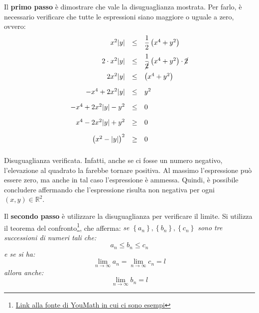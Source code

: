 \documentclass[a4paper]{article}
\begin{document}
	\noindent
	Il \textbf{primo passo} è dimostrare che vale la disuguaglianza mostrata. Per farlo, è necessario verificare che tutte le espressioni siano maggiore o uguale a zero, ovvero:
	\begin{equation*}
		\begin{array}{rcl}
			x^{2}|y| &\le& \dfrac{1}{2}\left(x^{4} + y^{2}\right) \\ [1em]
			2 \cdot x^{2}|y| &\le& \dfrac{1}{\cancel{2}}\left(x^{4} + y^{2}\right) \cdot \cancel{2} \\ [1em]
			2 x^{2}|y| &\le& \left(x^{4} + y^{2}\right) \\ [1em]
			-x^{4} + 2 x^{2}|y| &\le& y^{2} \\ [1em]
			-x^{4} + 2 x^{2}|y| - y^{2} &\le& 0 \\ [1em]
			x^{4} - 2 x^{2}|y| + y^{2} &\ge& 0 \\ [1em]
			\left(x^{2} - |y|\right)^{2} &\ge& 0 \\ [1em]
		\end{array}
	\end{equation*}
	Disuguaglianza verificata. Infatti, anche se ci fosse un numero negativo, l'elevazione al quadrato la farebbe tornare positiva. Al massimo l'espressione può essere zero, ma anche in tal caso l'espressione è ammessa. Quindi, è possibile concludere affermando che l'espressione risulta non negativa per ogni $\left(x,y\right) \in \mathbb{R}^{2}$.\newline
	
	\noindent
	Il \textbf{secondo passo} è utilizzare la disuguaglianza per verificare il limite. Si utilizza il teorema del confronto\footnote{\href{https://www.youmath.it/lezioni/analisi-matematica/limiti-continuita-e-asintoti/1562-teorema-dei-dei-carabinieri.html}{Link alla fonte di YouMath in cui ci sono esempi}}, che afferma: \emph{se $\left\{a_{n}\right\},\left\{b_{n}\right\},\left\{c_{n}\right\}$ sono tre successioni di numeri tali che:}
	\begin{equation*}
		a_{n} \le b_{n} \le c_{n}
	\end{equation*}
	\emph{e se si ha:}
	\begin{equation*}
		\displaystyle\lim_{n \rightarrow \infty} a_{n} = \displaystyle\lim_{n \rightarrow \infty} c_{n} = l
	\end{equation*}
	\emph{allora anche:}
	\begin{equation*}
		\displaystyle\lim_{n \rightarrow \infty} b_{n} = l
	\end{equation*}\newpage
\end{document}
